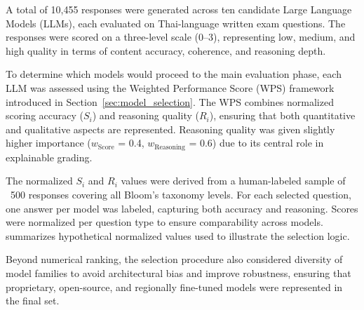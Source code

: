 
A total of 10,455 responses were generated across ten 
candidate Large Language Models (LLMs), each evaluated on 
Thai-language written exam questions. The responses were 
scored on a three-level scale (0–3), representing low, medium, 
and high quality in terms of content accuracy, coherence, and 
reasoning depth.

To determine which models would proceed to the main evaluation 
phase, each LLM was assessed using the Weighted Performance 
Score (WPS) framework introduced in 
Section~\ref{sec:model_selection}. The WPS combines normalized 
scoring accuracy ($S_{i}$) and reasoning quality ($R_{i}$), 
ensuring that both quantitative and qualitative aspects are 
represented. Reasoning quality was given slightly higher 
importance ($w_{\text{Score}}$ = 0.4, 
$w_{\text{Reasoning}}$ = 0.6) due to its central role in 
explainable grading.

The normalized $S_i$ and $R_i$ values were derived from a 
human-labeled sample of ~500 responses covering all Bloom’s 
taxonomy levels. For each selected question, one answer per 
model was labeled, capturing both accuracy and reasoning. 
Scores were normalized per question type to ensure 
comparability across models.  summarizes 
hypothetical normalized values used to illustrate the 
selection logic.

Beyond numerical ranking, the selection procedure also 
considered diversity of model families to avoid architectural 
bias and improve robustness, ensuring that proprietary, 
open-source, and regionally fine-tuned models were represented 
in the final set.

